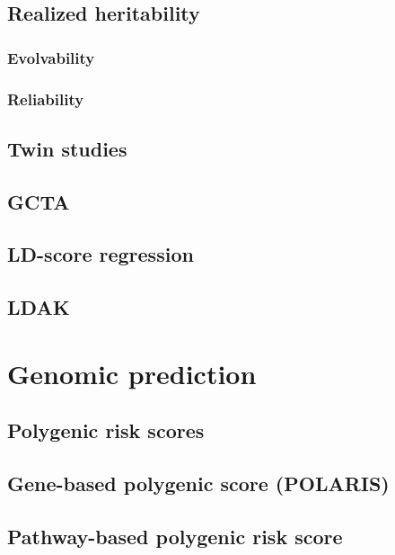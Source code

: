 \documentclass[]{book}
\theoremstyle{definition}
\theoremstyle{definition}
\theoremstyle{definition}
\theoremstyle{remark}
\begin{document}
\section{Realized heritability}\label{realized-heritability}

\subsection{Evolvability}\label{evolvability}

\subsection{Reliability}\label{reliability}

\section{Twin studies}\label{twin-studies}

\section{GCTA}\label{gcta}

\section{LD-score regression}\label{ld-score-regression}

\section{LDAK}\label{ldak}

\chapter{Genomic prediction}\label{genomic-prediction}

\section{Polygenic risk scores}\label{polygenic-risk-scores}

\section{Gene-based polygenic score
(POLARIS)}\label{gene-based-polygenic-score-polaris}

\section{Pathway-based polygenic risk
score}\label{pathway-based-polygenic-risk-score}
\end{document}
